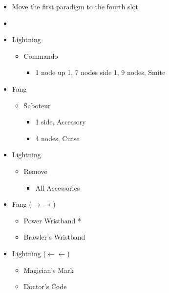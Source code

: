 \begin{menu}
		\begin{itemize}
			\paradigm
			\begin{itemize}
				\item Move the first paradigm to the fourth slot
				\item {}%
				      {\paradigmline{(\rav)}{\syn}{\sab}}%
				      {\paradigmline{(\rav)}{\rav}{(\sab)}}%
				      {\paradigmline{(\rav)}{(\rav)}{\com}}%
				      {\paradigmline[4]{\textit{\rav}}{\textit{\rav}}{\textit{\com}}}%
				      {\paradigmline{[\com]}{\rav}{\com}}%
				      {\paradigmline{[\com]}{\rav}{\com}}
			\end{itemize}
			\crystarium
			\begin{itemize}
				\item Lightning
				      \begin{itemize}
					      \item Commando
					            \begin{itemize}
						            \item 1 node up 1, 7 nodes side 1, 9 nodes, Smite
					            \end{itemize}
				      \end{itemize}
				\item Fang
				      \begin{itemize}
					      \item Saboteur
					            \begin{itemize}
						            \item 1 side, Accessory
						            \item 4 nodes, Curse
					            \end{itemize}
				      \end{itemize}
			\end{itemize}
			\equip
			\begin{itemize}
				\item Lightning
				      \begin{itemize}
					      \item Remove
					            \begin{itemize}
						            \item All Accessories
					            \end{itemize}
				      \end{itemize}
				\item Fang ($\rightarrow\rightarrow$)
				      \begin{itemize}
					      \item Power Wristband *
					      \item Brawler's Wristband
				      \end{itemize}
				\item Lightning ($\leftarrow\leftarrow$)
				      \begin{itemize}
					      \item Magician's Mark
					      \item Doctor's Code
				      \end{itemize}
			\end{itemize}
		\end{itemize}
\end{menu}

